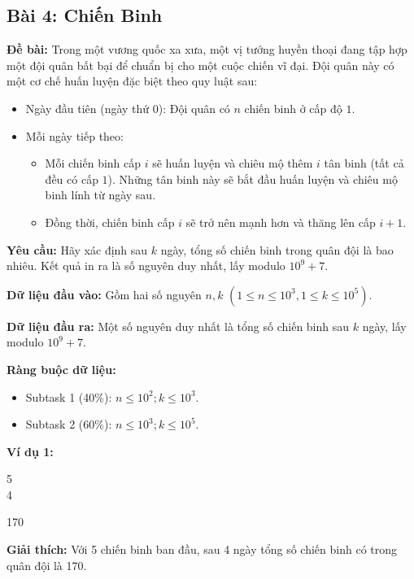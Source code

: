 \documentclass[12pt]{scrartcl}  %
\begin{document}
\subsection{Bài 4: Chiến Binh}

\textbf{Đề bài:}
Trong một vương quốc xa xưa, một vị tướng huyền thoại đang tập hợp một đội quân bất bại để chuẩn
bị cho một cuộc chiến vĩ đại. Đội quân này có một cơ chế huấn luyện đặc biệt theo quy luật sau:
\begin{itemize}
    \item Ngày đầu tiên (ngày thứ $0$): Đội quân có $n$ chiến binh ở cấp độ $1$.
    \item Mỗi ngày tiếp theo: 
    \begin{itemize}
        \item Mỗi chiến binh cấp $i$ sẽ huấn luyện và chiêu mộ thêm $i$ tân binh (tất cả đều có cấp $1$).
Những tân binh này sẽ bắt đầu huấn luyện và chiêu mộ binh lính từ ngày sau.
        \item Đồng thời, chiến binh cấp $i$ sẽ trở nên mạnh hơn và thăng lên cấp $i + 1$.
    \end{itemize}
\end{itemize}

\textbf{Yêu cầu:}
Hãy xác định sau $k$ ngày, tổng số chiến binh trong quân đội là bao nhiêu.
Kết quả in ra là số nguyên duy nhất, lấy modulo $10^9 + 7$.

\textbf{Dữ liệu đầu vào:}
Gồm hai số nguyên $n, k$ $(1 \leq n \leq 10^3, 1 \leq k \leq 10^5)$.

\textbf{Dữ liệu đầu ra:}
Một số nguyên duy nhất là tổng số chiến binh sau $k$ ngày, lấy modulo $10^9 + 7$.

\textbf{Ràng buộc dữ liệu:}
\begin{itemize}
    \item Subtask 1 (40\%): $n \leq 10^2; k \leq 10^3$.
    \item Subtask 2 (60\%): $n \leq 10^3; k \leq 10^5$.
\end{itemize}

\textbf{Ví dụ 1:}
\begin{tcolorbox}[colback=gray!5!white, colframe=blue!50!black, title=Input]
5\\
4
\end{tcolorbox}
\begin{tcolorbox}[colback=gray!5!white, colframe=green!50!black, title=Output]
170
\end{tcolorbox}

\textbf{Giải thích:}
Với 5 chiến binh ban đầu, sau 4 ngày tổng
số chiến binh có trong quân đội là 170.
\end{document}
